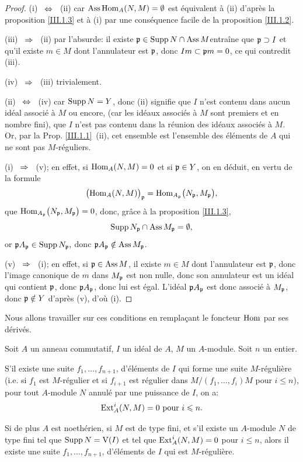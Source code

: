 \skpt
\begin{proof}
(i) ~$\Ssi$~ (ii) car $\operatorname{Ass} \operatorname{Hom}_A(N, M)=\emptyset$ est \'equivalent \`a (ii) d'apr\`es la proposition \ref{III.1.3} et \`a (i) par une cons\'equence facile de la proposition \ref{III.1.2}.

(iii) ~$\To$~ (ii) par l'absurde: \og il existe $\mathfrak{p} \in \operatorname{Supp} N \cap \operatorname{Ass} M$\fg entra\^ine que $\mathfrak{p} \supset I$ et qu'il existe $m\in M$ dont l'annulateur est $\mathfrak{p} $, donc $Im \subset \mathfrak{p} m=0$, ce qui contredit (iii).

(iv) ~$\To$~ (iii) trivialement.

(ii) ~$\Ssi$~ (iv) car $\operatorname{Supp} N = Y$, donc (ii) signifie que $I$ n'est contenu dans aucun id\'eal associ\'e \`a $M$ ou encore, (car les id\'eaux associ\'es \`a $M$ sont premiers et en nombre fini), que $I$ n'est pas contenu dans la r\'eunion des id\'eaux associ\'es \`a $M$. Or, par la Prop. \ref{III.1.1}~(ii), cet ensemble est l'ensemble des \'el\'ements de $A$ qui ne sont pas $M$-r\'eguliers.

(i) ~$\To$~ (v); en effet, si $\operatorname{Hom}_A(N, M)=0$ et si $\mathfrak{p} \in Y$, on en d\'eduit, en vertu de la formule
\[
\bigl(\operatorname{Hom}_A(N, M) \bigr)_{\mathfrak{p}} = \operatorname{Hom}_{A_{\mathfrak{p}}} \bigl(N_{\mathfrak{p}}, M_{\mathfrak{p}} \bigr),
\]
que $\operatorname{Hom}_{A_{\mathfrak{p}}} \bigl(N_{\mathfrak{p}}, M_{\mathfrak{p}} \bigr)=0$, donc, gr\^ace \`a la proposition \ref{III.1.3},
\[
\operatorname{Supp} N_{\mathfrak{p}} \cap \operatorname{Ass} M_{\mathfrak{p}} = \emptyset,
\]
or $\mathfrak{p} A_{\mathfrak{p}} \in \operatorname{Supp} N_{\mathfrak{p}}, $ donc $ \mathfrak{p} A_{\mathfrak{p}} \notin \operatorname{Ass} M_{\mathfrak{p}}$.

(v) ~$\To$~ (i); en effet, si $\mathfrak{p} \in \operatorname{Ass} M$, il existe $m\in M$ dont l'annulateur est $\mathfrak{p}$, donc l'image canonique de $m$ dans $M_{\mathfrak{p}}$ est non nulle, donc son annulateur est un id\'eal qui contient $\mathfrak{p}$, donc $\mathfrak{p} A_{\mathfrak{p}}$, donc lui est \'egal. L'id\'eal $\mathfrak{p} A_{\mathfrak{p}}$ est donc associ\'e \`a $M_{\mathfrak{p}}$, donc $\mathfrak{p} \notin Y$ d'apr\`es (v), d'o\`u (i).
\end{proof}

Nous allons travailler sur ces conditions en rempla\c cant le
foncteur $\operatorname{Hom}$ par ses d\'eriv\'es.

\begin{theoreme} \label{III.2.2}
Soit $A$ un anneau commutatif, $I$ un id\'eal de $A$, $M$ un $A$-module. Soit $n$ un entier.

\begin{enumeratea}
\item
S'il existe une suite $f_1, \ldots, f_{n+1}$, d'\'el\'ements de $I$ qui forme une suite $M$-r\'eguli\`ere (i.e. si $f_1$ est $M$-r\'egulier et si $f_{i+1}$ est r\'egulier dans $M/(f_1, \ldots, f_i)M$ pour $i\leq n$), pour tout $A$-module $N$ annul\'e par une puissance de $I$, on a:
\[
\operatorname{Ext}_A^i(N, M)=0 \text{ pour } i\leqslant n.
\]

\item
Si de plus $A$ est noeth\'erien, si $M$ est de type fini, et s'il existe un $A$-module $N$ de type fini tel que $\operatorname{Supp} N = \operatorname{V}(I)$ et tel que $\operatorname{Ext}_A^i(N, M)=0$ pour $i\leq n$, alors il existe une suite $f_1, \ldots, f_{n+1}$, d'\'el\'ements de $I$ qui est $M$-r\'eguli\`ere.
\end{enumeratea}
\end{theoreme}

